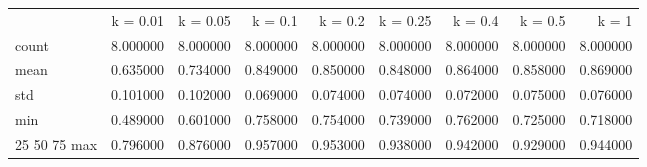 \begin{tabular}{lrrrrrrrr}
 & k = 0.01 & k = 0.05 &  k = 0.1 & k = 0.2 & k = 0.25 & k = 0.4 & k = 0.5 & k = 1 \\
count & 8.000000 & 8.000000 & 8.000000 & 8.000000 & 8.000000 & 8.000000 & 8.000000 & 8.000000 \\
mean & 0.635000 & 0.734000 & 0.849000 & 0.850000 & 0.848000 & 0.864000 & 0.858000 & 0.869000 \\
std & 0.101000 & 0.102000 & 0.069000 & 0.074000 & 0.074000 & 0.072000 & 0.075000 & 0.076000 \\
min & 0.489000 & 0.601000 & 0.758000 & 0.754000 & 0.739000 & 0.762000 & 0.725000 & 0.718000 \\
25%
50%
75%
max & 0.796000 & 0.876000 & 0.957000 & 0.953000 & 0.938000 & 0.942000 & 0.929000 & 0.944000 \\
\end{tabular}
